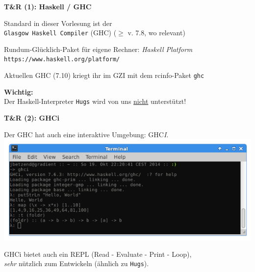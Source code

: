 \documentclass[unknownkeysallowed]{beamer}
\begin{document}
  
  \begin{frame}
    \Large\textbf{T\&R (1): Haskell / GHC}\bigskip \normalsize
    
    Standard in dieser Vorlesung ist der  \\ \texttt{Glasgow Haskell Compiler} (GHC)
    ($\geqslant$ v. 7.8, wo relevant) \pause \bigskip
    
    Rundum-Glücklich-Paket für eigene Rechner: \emph{Haskell Platform}\\
    \texttt{https://www.haskell.org/platform/} \pause \bigskip
    
    Aktuellen GHC (7.10) kriegt ihr im GZI mit dem rcinfo-Paket \texttt{ghc} \pause \smallskip
    
    \begin{important}
    \textbf{Wichtig:}\\Der Haskell-Interpreter \texttt{Hugs} wird von uns \underline{nicht} unterstützt!
    \end{important}
  \end{frame}
  
  
  \begin{frame}
    \Large\textbf{T\&R (2): GHCi}\bigskip \normalsize
    
    Der GHC hat auch eine interaktive Umgebung: GHC\emph{I}.\\\bigskip
    \includegraphics[scale=0.4]{ghci_example.png} 
    
    \bigskip GHCi bietet auch ein REPL (Read - Evaluate - Print - Loop),\\\emph{sehr} nützlich zum Entwickeln (ähnlich zu \texttt{Hugs}).
  \end{frame}
  
\end{document}
